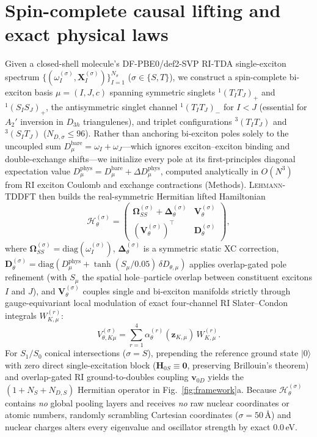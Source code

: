 \documentclass[10pt,twocolumn]{article}
\theoremstyle{natthm}
\newcommand{\leh}{\textsc{Lehmann-TDDFT}}
\newcommand{\Hlift}{\mathcal{H}_{\theta}^{(\sigma)}}
\begin{document}
\section*{Spin-complete causal lifting and exact physical laws}
Given a closed-shell molecule's DF-PBE0/def2-SVP RI-TDA single-exciton spectrum $\{(\omega_I^{(\sigma)},\mathbf{X}_I^{(\sigma)})\}_{I=1}^{N_\sigma}$ ($\sigma\in\{S,T\}$), we construct a spin-complete bi-exciton basis $\mu=(I,J,c)$ spanning symmetric singlets $^1(T_I T_J)_+$ and $^1(S_I S_J)_+$, the antisymmetric singlet channel $^1(T_I T_J)_-$ for $I<J$ (essential for $A_2'$ inversion in $D_{3h}$ triangulenes), and triplet configurations $^3(T_I T_J)$ and $^3(S_I T_J)$ ($N_{D,\sigma}\le 96$).
Rather than anchoring bi-exciton poles solely to the uncoupled sum $D_\mu^{\mathrm{bare}}=\omega_I+\omega_J$---which ignores exciton--exciton binding and double-exchange shifts---we initialize every pole at its first-principles diagonal expectation value $D_\mu^{\mathrm{phys}}=D_\mu^{\mathrm{bare}}+\Delta D_\mu^{\mathrm{phys}}$, computed analytically in $O(N^3)$ from RI exciton Coulomb and exchange contractions (Methods).
\leh{} then builds the real-symmetric Hermitian lifted Hamiltonian
\begin{equation}
\Hlift = \begin{pmatrix}
\mathbf{\Omega}_{SS}^{(\sigma)} + \mathbf{\Delta}_\theta^{(\sigma)} & \mathbf{V}_\theta^{(\sigma)} \\
(\mathbf{V}_\theta^{(\sigma)})^\top & \mathbf{D}_\theta^{(\sigma)}
\end{pmatrix},
\label{eq:hlift}
\end{equation}
where $\mathbf{\Omega}_{SS}^{(\sigma)}=\mathrm{diag}(\omega_I^{(\sigma)})$, $\mathbf{\Delta}_\theta^{(\sigma)}$ is a symmetric static XC correction, $\mathbf{D}_\theta^{(\sigma)}=\mathrm{diag}(D_\mu^{\mathrm{phys}}+\tanh(S_\mu/0.05)\,\delta D_{\theta,\mu})$ applies overlap-gated pole refinement (with $S_\mu$ the spatial hole--particle overlap between constituent excitons $I$ and $J$), and $\mathbf{V}_\theta^{(\sigma)}$ couples single and bi-exciton manifolds strictly through gauge-equivariant local modulation of exact four-channel RI Slater--Condon integrals $W_{K,\mu}^{(r)}$:
\begin{equation}
V_{\theta,K\mu}^{(\sigma)} = \sum_{r=1}^{4}\alpha_\theta^{(r)}\!\left(\mathbf{z}_{K,\mu}\right)\, W_{K,\mu}^{(r)}.
\label{eq:v_equiv}
\end{equation}
For $S_1/S_0$ conical intersections ($\sigma=S$), prepending the reference ground state $|0\rangle$ with zero direct single-excitation block ($\mathbf{H}_{0S}\equiv\mathbf{0}$, preserving Brillouin's theorem) and overlap-gated RI ground-to-doubles coupling $\mathbf{v}_{0D}$ yields the $(1+N_S+N_{D,S})$ Hermitian operator in Fig.~\ref{fig:framework}a.
Because $\Hlift$ contains \emph{no} global pooling layers and receives \emph{no} raw nuclear coordinates or atomic numbers, randomly scrambling Cartesian coordinates ($\sigma=50$\,\AA) and nuclear charges alters every eigenvalue and oscillator strength by exact $0.0$\,eV.
\end{document}
